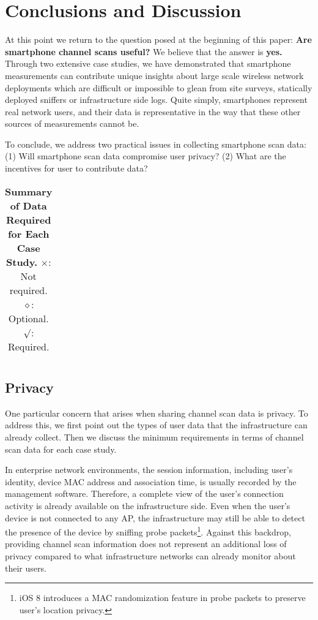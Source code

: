 \section{Conclusions and Discussion}
\label{sec:conclusion}

At this point we return to the question posed at the beginning of this paper:
\textbf{Are smartphone channel scans useful?} We believe that the answer is
\textbf{yes.} Through two extensive case studies, we have demonstrated that
smartphone measurements can contribute unique insights about large scale
wireless network deployments which are difficult or impossible to glean from
site surveys, statically deployed sniffers or infrastructure side logs. Quite
simply, smartphones represent real network users, and their data is
representative in the way that these other sources of measurements cannot be.

To conclude, we address two practical issues in collecting smartphone
scan data: (1) Will smartphone scan data compromise user privacy? (2) What
are the incentives for user to contribute data? 

\begin{table*}[t!]
  \centering
  \begin{tabular}{cccccccc}
    
  \end{tabular}
  \caption{\textbf{Summary of Data Required for Each Case Study.} $\times$: Not
  required. $\diamond$: Optional. $\surd$: Required.}
  \label{tab:privacy}
  \vspace*{\aftercaptiongap}
\end{table*}

\subsection{Privacy}
\label{subsec:privacy}

One particular concern that arises when sharing channel scan data is privacy.
To address this, we first point out the types of user data that the
infrastructure can already collect. Then we discuss the minimum
requirements in terms of channel scan data for each case study.

In enterprise network environments, the \wifi{} session information,
including user's identity, device MAC address and association time, is usually
recorded by the management software. Therefore, a complete view of the user's
\wifi{} connection activity is already available on the infrastructure side.
Even when the user's device is not connected to any AP, the infrastructure
may still be able to detect the presence of the device by sniffing probe
packets\footnote{iOS 8 introduces a MAC randomization feature in probe
packets to preserve user's location privacy.}. Against this backdrop,
providing channel scan information does not represent an additional loss of
privacy compared to what infrastructure networks can already monitor about
their users.

